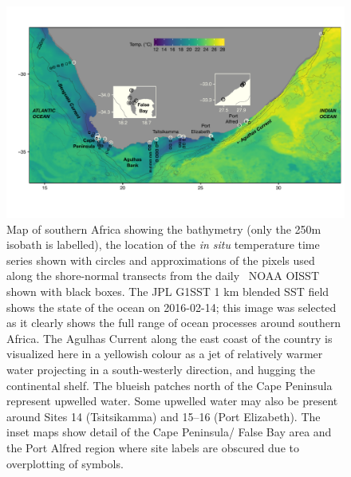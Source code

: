 \documentclass[a4paper,10pt,review]{elsarticle}
\begin{document}
\begin{figure}
\includegraphics[width=1.0\textwidth]{figure1_1km_inset_map_labeled.pdf}
\caption{Map of southern Africa showing the bathymetry (only the 250m isobath is labelled), the location of the \emph{in situ} temperature time series shown with circles and approximations of the pixels used along the shore-normal transects from the daily \degree~NOAA OISST \citep{Reynolds2007} shown with black boxes. The JPL G1SST 1 km blended SST field shows the state of the ocean on 2016-02-14; this image was selected as it clearly shows the full range of ocean processes around southern Africa. The Agulhas Current along the east coast of the country is visualized here in a yellowish colour as a jet of relatively warmer water projecting in a south-westerly direction, and hugging the continental shelf. The blueish patches north of the Cape Peninsula represent upwelled water. Some upwelled water may also be present around Sites 14 (Tsitsikamma) and 15--16 (Port Elizabeth). The inset maps show detail of the Cape Peninsula/ False Bay area and the Port Alfred region where site labels are obscured due to overplotting of symbols.}
\label{fig:Figure1}
\end{figure}
\end{document}
